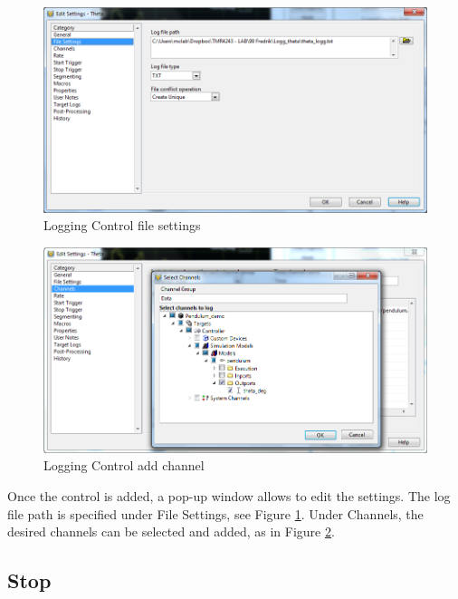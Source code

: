 \documentclass[a4paper,twoside,english]{report}
\begin{document}
\begin{figure}[h]
\centering \includegraphics[scale=0.45]{fig/veristand_ws_logging_file}
\caption{Logging Control file settings}

\label{fig: veristand workspace logging file} 
\end{figure}
\begin{figure}[h]
\centering \includegraphics[scale=0.45]{fig/veristand_ws_logging_add_ch}
\caption{Logging Control add channel}

\label{fig: veristand workspace logging channels} 
\end{figure}

Once the control is added, a pop-up window allows to edit the settings.
The log file path is specified under File Settings, see Figure \ref{fig: veristand workspace logging file}.
Under Channels, the desired channels can be selected and added, as
in Figure \ref{fig: veristand workspace logging channels}.

\subsection{Stop}
\end{document}
